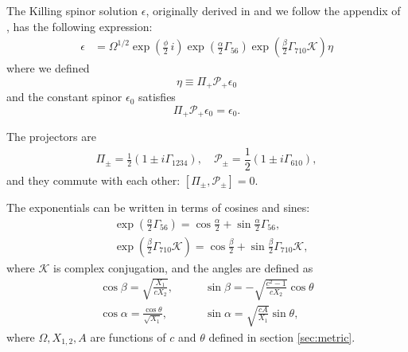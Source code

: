 
The Killing spinor solution $\epsilon$, originally derived in \cite{Pilch:2003jg} and we follow the appendix of \cite{Chen-Lin:2015xlh}, has the following expression:
\begin{align}
\epsilon &= \Omega^{1/2} \exp{\left(\frac{\phi}{2}\, i \right)} \exp{\left(\frac{\alpha}{2}\Gamma_{56} \right)} \exp{\left(\frac{\beta}{2}\Gamma_{7 10} \mathcal{K} \right)} \eta
\end{align}
where we defined
\begin{equation}
\eta \equiv \Pi_{+} \mathcal{P}_+ \epsilon_0
\end{equation}
and the constant spinor $\epsilon_0$ satisfies
\begin{equation}
 \Pi_+ \mathcal{P}_+ \epsilon_0 = \epsilon_0.
\end{equation}

The projectors are
\begin{align}
\Pi_\pm = 
\frac{1}{2}\left(1 \pm i\Gamma_{1234}\right), 
\quad
\mathcal{P}_{\pm} =
\dfrac{1}{2} \left(1\pm i\Gamma_{6 10}\right),
\end{align}
and they commute with each other: $[\Pi_\pm, \mathcal{P}_{\pm}]=0$. 


The exponentials can be written in terms of cosines and sines:
\begin{align}
&\exp{\left(\frac{\alpha}{2}\Gamma_{56} \right)} = \cos\frac{\alpha}{2} + \sin\frac{\alpha}{2}\Gamma_{5 6},\\
&\exp{\left(\frac{\beta}{2}\Gamma_{7 10} \mathcal{K} \right)} = \cos\frac{\beta}{2} + \sin\frac{\beta}{2}\Gamma_{7 10}\mathcal{K},
\end{align}
where $\mathcal{K}$ is complex conjugation, and the angles are defined as
\begin{align}
\cos\beta = \sqrt{\frac{X_1}{c X_2}}, \quad 
&\quad
\sin\beta = -\sqrt{\frac{c^2 - 1}{c X_2}}\cos\theta\\
%
\cos\alpha = \frac{\cos\theta}{\sqrt{X_1}}, 
&\quad
\sin\alpha = \sqrt{\frac{c A}{X_1}}\sin\theta,
\end{align}
where $\Omega, X_{1,2}, A$ are functions of $c$ and $\theta$ defined in section \ref{sec:metric}.


